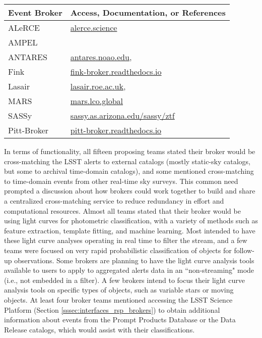 \begin{table}[h!]
\label{tab:brokers}
\centering
 \begin{tabular}{ll} 
 \hline
 Event \gls{Broker} & Access, Documentation, or References \\
 \hline\hline
 ALeRCE & \url{alerce.science} \\
 \gls{AMPEL} & \protect{\citet{ampel}} \\
 \gls{ANTARES} & \url{antares.noao.edu},\ \protect{\citet{2016SPIE.9910E..0FS}}\\
 Fink & \url{fink-broker.readthedocs.io} \\
 Lasair & \url{lasair.roe.ac.uk},\ \protect{\citet{2019RNAAS...3...26S}} \\
 \gls{MARS} & \url{mars.lco.global} \\
 SASSy & \url{sassy.as.arizona.edu/sassy/ztf} \\
 Pitt-Broker & \url{pitt-broker.readthedocs.io} \\
 \hline
 \end{tabular}
\end{table}

In terms of functionality, all fifteen proposing teams stated their broker would be cross-matching the \gls{LSST} alerts to external catalogs (mostly static-sky catalogs, but some to archival time-domain catalogs), and some mentioned cross-matching to time-domain events from other real-time sky surveys.
This common need prompted a discussion about how brokers could work together to build and share a centralized cross-matching service to reduce redundancy in effort and computational resources.
Almost all teams stated that their broker would be using light curves for photometric classification, with a variety of methods such as feature extraction, template fitting, and machine learning.
Most intended to have these light curve analyses operating in real time to filter the stream, and a few teams were focused on very rapid probabilistic classification of objects for follow-up observations. 
Some brokers are planning to have the light curve analysis tools available to users to apply to aggregated alerts data in an ``non-streaming" mode (i.e., not embedded in a filter). 
A few brokers intend to focus their light curve analysis tools on specific types of objects, such as variable stars or moving objects.
At least four broker teams mentioned accessing the \gls{LSST} \gls{Science Platform} (Section \ref{sssec:interfaces_rsp_brokers}) to obtain additional information about events from the Prompt Products Database or the \gls{Data Release} catalogs, which would assist with their classifications.

